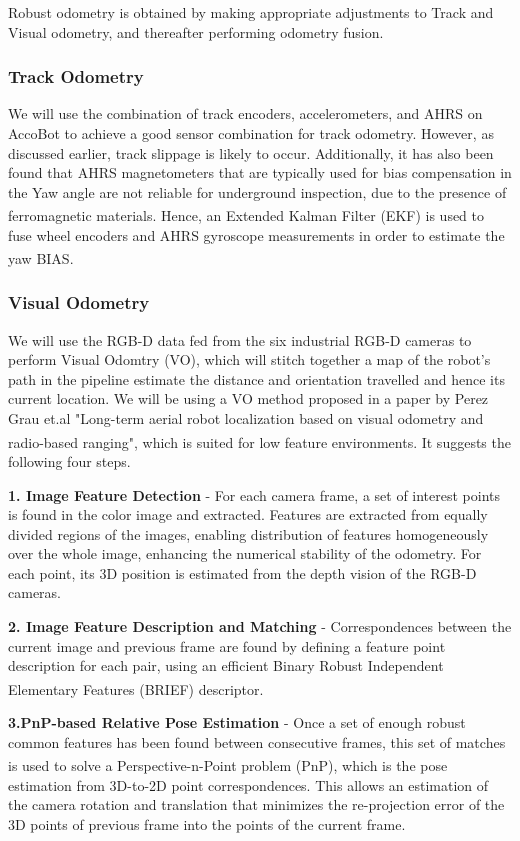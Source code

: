 \documentclass[11pt]{article}		%
\newcommand{\supercite}[1]{\textsuperscript{\cite{#1}}}		%
\begin{document}
	Robust odometry is obtained by making appropriate adjustments to Track and Visual odometry, and thereafter performing odometry fusion. 
  \subsubsection{Track Odometry}
		We will use the combination of track encoders, accelerometers, and AHRS on AccoBot to achieve a good sensor combination for track odometry. However, as discussed earlier, track slippage is likely to occur. Additionally, it has also been found that AHRS magnetometers that are typically used for bias compensation in the Yaw angle are not reliable for underground inspection, due to the presence of ferromagnetic materials\supercite{AHRSinaccuracy}. Hence, an Extended Kalman Filter (EKF) is used to fuse wheel encoders and AHRS gyroscope measurements in order to estimate the yaw BIAS\supercite{kalmanfilter}. 

	\subsubsection{Visual Odometry}
	We will use the RGB-D data fed from the six industrial RGB-D cameras to perform Visual Odomtry (VO), which will stitch together a map of the robot's path in the pipeline estimate the distance and orientation travelled and hence its current location. We will be using a VO method proposed in a paper by Perez Grau et.al "Long-term aerial robot localization based on visual odometry and radio-based ranging"\supercite{VO}, which is suited for low feature environments. It suggests the following four steps.

	\textbf{1. Image Feature Detection} - For each camera frame, a set of interest points is found in the color image and extracted. Features are extracted from equally divided regions of the images, enabling distribution of features homogeneously over the whole image, enhancing the numerical stability of the odometry. For each point, its 3D position is estimated from the depth vision of the RGB-D cameras.
	
	\textbf{2. Image Feature Description and Matching} - Correspondences between the current image and previous frame are found by defining a feature point description for each pair, using an efficient Binary Robust Independent Elementary Features (BRIEF) \supercite{BRIEF} descriptor. 
    
    \textbf{3.PnP-based Relative Pose Estimation} - Once a set of enough robust common features has been found between consecutive frames, this set of matches is used to solve a Perspective-n-Point problem (PnP)\supercite{PnP}, which is the pose estimation from 3D-to-2D point correspondences. This allows an estimation of the camera rotation and translation that minimizes the re-projection error of the 3D points of previous frame into the points of the current frame. 
\end{document}
